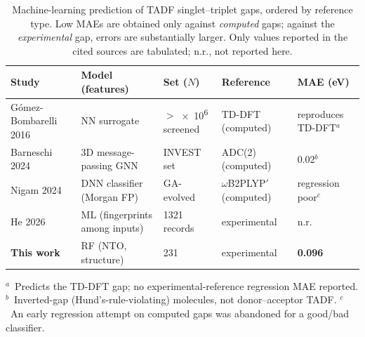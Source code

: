 \documentclass[final,3p,times,twocolumn]{elsarticle}
\begin{document}
\begin{table}[htbp]
  \centering
  \caption{Machine-learning prediction of TADF singlet--triplet gaps, ordered by
    reference type. Low MAEs are obtained only against \emph{computed} gaps;
    against the \emph{experimental} gap, errors are substantially larger. Only
    values reported in the cited sources are tabulated; n.r., not reported here.}
  \label{tab:prior_ml}
  \footnotesize\setlength{\tabcolsep}{4pt}
  \begin{tabular}{lllll}
    \toprule
    Study & Model (features) & Set ($N$) & Reference & MAE (eV) \\
    \midrule
    G\'omez-Bombarelli 2016~\cite{Gomez-Bombarelli2016} & NN surrogate & $>$\num{e6} screened & TD-DFT (computed) & reproduces TD-DFT$^{a}$ \\
    Barneschi 2024~\cite{Barneschi2024} & 3D message-passing GNN & INVEST set & ADC(2) (computed) & 0.02$^{b}$ \\
    Nigam 2024~\cite{Nigam2024} & DNN classifier (Morgan FP) & GA-evolved & $\omega$B2PLYP$'$ (computed) & regression poor$^{c}$ \\
    He 2026~\cite{He2026} & ML (fingerprints among inputs) & \num{1321} records & experimental & n.r. \\
    \textbf{This work} & RF (NTO, structure) & 231 & experimental & \textbf{0.096} \\
    \bottomrule
  \end{tabular}

  \vspace{2pt}
  {\footnotesize\raggedright
   $^{a}$~Predicts the TD-DFT gap; no experimental-reference regression MAE reported.
   $^{b}$~Inverted-gap (Hund's-rule-violating) molecules, not donor--acceptor TADF.
   $^{c}$~An early regression attempt on computed gaps was abandoned for a good/bad
   classifier.\par}
\end{table}


\end{document}
